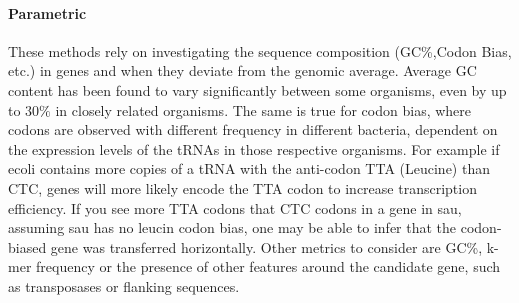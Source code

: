 \documentclass[12pt,letter]{article}
\begin{document}
\paragraph{Parametric}
These methods rely on investigating the sequence composition (GC\%,Codon Bias, etc.) in genes and when they deviate from the genomic average.
Average GC content has been found to vary significantly between some organisms, even by up to $30\%$ in closely related organisms\citep{ihgt}.
The same is true for codon bias, where codons are observed with different frequency in different bacteria, dependent on the expression levels of the tRNAs in those respective organisms\citep{ihgt,codonbias}.
For example if \ac{ecoli} contains more copies of a tRNA with the anti-codon TTA (Leucine) than CTC, genes will more likely encode the TTA codon to increase transcription efficiency\citep{codonbias}.
If you see more TTA codons that CTC codons in a gene in \ac{sau}, assuming \ac{sau} has no leucin codon bias, one may be able to infer that the codon-biased gene was transferred horizontally\citep{ihgt}.
Other metrics to consider are GC\%, k-mer frequency or the presence of other features around the candidate gene, such as transposases or flanking sequences\citep{ihgt}.
\end{document}
